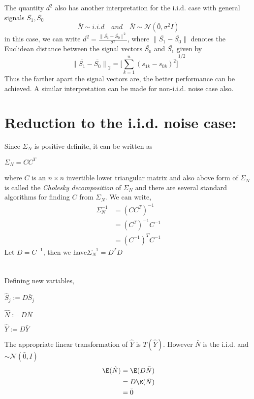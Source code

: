 \documentclass[12pt]{report}
\begin{document}
The quantity $d^2$ also has another interpretation for the i.i.d. case with general signals $\bar{S_1},\bar{S_0}$\\
\[\bar{N}\sim i.i.d\quad and \quad \bar{N}\sim\mathcal{N}(\bar{0},\sigma^2I)\]
in this case, we can write $d^2=\frac{\parallel\bar{S_1}-\bar{S_0}\parallel^2}{\sigma^2}$,
where $\parallel\bar{S_1}-\bar{S_0}\parallel$ denotes the Euclidean distance between the signal vectors $\bar{S_0}$ and $\bar{S_1}$ given by
\[{\parallel\bar{S_1}-\bar{S_0}\parallel}_2={\lbrack{\sum_{k=1}^{n}(s_{1k}-s_{0k})^2}\rbrack}^{1/2}\]
Thus the farther apart the signal vectors are, the better performance can be achieved. A similar interpretation can be made for non-i.i.d. noise case also.
 
\section{Reduction to the i.i.d. noise case:}
 Since $\varSigma_{N}$ is positive definite, it can be written as   
 \begin{center}
$ \varSigma_{N}=CC^T$
 \end{center} where $C$ is an $n\times n$ invertible lower triangular matrix and also above form of $\varSigma_{N}$ is called the \textit{Cholesky decomposition} of $\varSigma_{N}$ and there are several standard algorithms for finding $C$ from $\varSigma_{N}$. We can write,
\begin{align*}
\varSigma_{N}^{-1}&=(CC^T)^{-1}\\ &=(C^T)^{-1}C^{-1}\\ &=(C^{-1})^TC^{-1}
\end{align*} 
Let $D=C^{-1}$, then we have\quad $\varSigma_{N}^{-1}=D^TD$\\ \\
\\
Defining new variables,
\begin{center}
	$\hat{S}_j:=D\bar{S}_j$
\end{center}
\begin{center}
    $\hat{N}:=D\bar{N}$
\end{center}
\begin{center}
	$\hat{Y}:=D\bar{Y}$
\end{center}
The appropriate linear transformation of $\hat{Y}$ is $T(\hat{Y}) $. However $\bar{N}$ is the i.i.d. and
$\sim \mathcal{N}(\bar{0},I)$
\begin{align*}
\E(\hat{N})&= \E(D\bar{N})\\&= D\E(\bar{N})\\&= \bar{0}
\end{align*}
\end{document}
